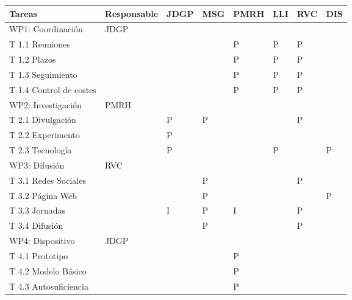 \documentclass[11pt]{extarticle}
\begin{document}
					\begin{table}[H]
					    \centering
						\begin{tabular}{m{4.5cm} m{2.5cm} m{0.4cm} m{0.4cm} m{0.4cm} m{0.4cm} m{0.4cm} m{0.4cm}}
							\hline
							\multicolumn{1}{m{4.5cm}}{\centering \textbf{Tareas}} &  
							\multicolumn{1}{m{2.5cm}}{\centering \textbf{Responsable}} &
							\multicolumn{1}{m{1.cm}}{\centering \textbf{JDGP}} &
							\multicolumn{1}{m{1.cm}}{\centering \textbf{MSG}} &
							\multicolumn{1}{m{1.cm}}{\centering \textbf{PMRH}} &
							\multicolumn{1}{m{1.cm}}{\centering \textbf{LLI}} &
							\multicolumn{1}{m{1.cm}}{\centering \textbf{RVC}} &
							\multicolumn{1}{m{1.cm}}{\centering \textbf{DIS}} \\ \hline
						   	\hline
						   	WP1: Coordinación 		& JDGP 	&	& 	& 	& 	&	&   \\ \hline
						    T 1.1 Reuniones 		& 		&	& 	& P	& P	& P	&   \\ \hline
						    T 1.2 Plazos 			& 		&	& 	& P	& P	& P	&   \\ \hline
						    T 1.3 Seguimiento 		& 		&	& 	& P	& P	& P	&   \\ \hline
						    T 1.4 Control de costes & 		&	& 	& P	& P	& P	&   \\ \hline
						    WP2: Investigación 		& PMRH 	&	& 	& 	& 	&	&   \\ \hline
						    T 2.1 Divulgación 		& 		& P	& P	& 	& 	& P	&   \\ \hline
						    T 2.2 Experimento 		& 		& P	& 	& 	& 	&	&   \\ \hline
						    T 2.3 Tecnología 		& 		& P	& 	& 	& P	&	& P \\ \hline
						    WP3: Difusión 			& RVC 	&	& 	& 	& 	&	&   \\ \hline
						    T 3.1 Redes Sociales 	& 		&	& P	& 	& 	& P	&   \\ \hline
						    T 3.2 Página Web 		& 		&	& P	& 	& 	&	& P \\ \hline
						    T 3.3 Jornadas 			& 		& I	& P	& I	& 	& P	&   \\ \hline
						    T 3.4 Difusión 			& 		&	& P	& 	& 	& P	&   \\ \hline
						    WP4: Dispositivo 		& JDGP 	&	& 	& 	& 	&	&   \\ \hline
						    T 4.1 Prototipo 		& 		&	& 	& P	& 	&	&   \\ \hline
						    T 4.2 Modelo Básico 	& 		&	& 	& P	& 	&	&   \\ \hline
						    T 4.3 Autosuficiencia 	& 		&	& 	& P	& 	&	&   \\ \hline

\end{tabular}
\end{table}
\end{document}
